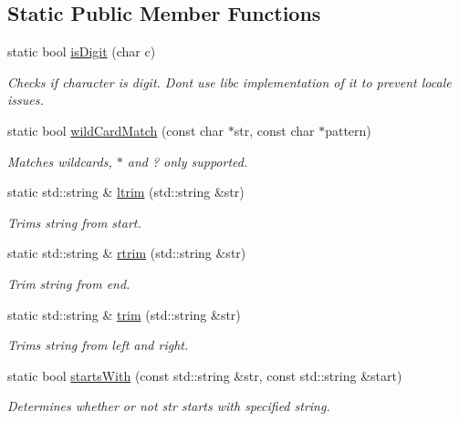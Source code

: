 \subsection*{Static Public Member Functions}
\begin{DoxyCompactItemize}
\item 
static bool \hyperlink{classel_1_1base_1_1utils_1_1_str_a4caae91dfe0310d9f182bd9b7e99103c}{is\+Digit} (char c)
\begin{DoxyCompactList}\small\item\em Checks if character is digit. Dont use libc implementation of it to prevent locale issues. \end{DoxyCompactList}\item 
static bool \hyperlink{classel_1_1base_1_1utils_1_1_str_a95e007a25dfcbd77d4c573b0f73b3153}{wild\+Card\+Match} (const char $\ast$str, const char $\ast$pattern)
\begin{DoxyCompactList}\small\item\em Matches wildcards, \textquotesingle{}$\ast$\textquotesingle{} and \textquotesingle{}?\textquotesingle{} only supported. \end{DoxyCompactList}\item 
static std\+::string \& \hyperlink{classel_1_1base_1_1utils_1_1_str_a64b7a841f04ed916ed8d234b8508703e}{ltrim} (std\+::string \&str)
\begin{DoxyCompactList}\small\item\em Trims string from start. \end{DoxyCompactList}\item 
static std\+::string \& \hyperlink{classel_1_1base_1_1utils_1_1_str_a9202797763e10861c4fa84ffd40198bb}{rtrim} (std\+::string \&str)
\begin{DoxyCompactList}\small\item\em Trim string from end. \end{DoxyCompactList}\item 
static std\+::string \& \hyperlink{classel_1_1base_1_1utils_1_1_str_aba0bc132c410fd3c1e128d1038e996ba}{trim} (std\+::string \&str)
\begin{DoxyCompactList}\small\item\em Trims string from left and right. \end{DoxyCompactList}\item 
static bool \hyperlink{classel_1_1base_1_1utils_1_1_str_acf80221cec72da701ef50995a61ab91f}{starts\+With} (const std\+::string \&str, const std\+::string \&start)
\begin{DoxyCompactList}\small\item\em Determines whether or not str starts with specified string. \end{DoxyCompactList}\item 

\end{DoxyCompactItemize}

